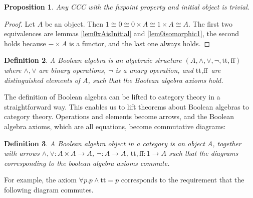 \documentclass[a4paper]{article}
\newcommand{\arr}{\rightarrow}
\newcommand{\product}{\!\times\!}
\newtheorem{definition}{Definition}[section]
\newtheorem{proposition}[definition]{Proposition}
\begin{document}
\begin{proposition} \label{propCCCNoFixpointInitialObject}
Any CCC with the fixpoint property and initial object is trivial.
\end{proposition}

\begin{proof}
Let $A$ be an object.  Then $1 \cong 0 \cong 0 \product A \cong 1 \product A
\cong A$. The first two equivalences are lemmas \ref{lem0xAisInitial} and
\ref{lem0isomorphic1}, the second holds because $- \product A$ is a functor, and
the last one always holds.
\end{proof}

\newcommand{\true}{\text{tt}}
\newcommand{\false}{\text{ff}}

\begin{definition}
A \emph{Boolean algebra} is an algebraic structure $(A, \wedge, \vee, \neg,
\true, \false)$ where $\wedge, \vee$ are binary operations, $\neg$ is a unary
operation, and $\true, \false$ are distinguished elements of $A$, such that the
Boolean algebra axioms hold.
\end{definition}

The definition of Boolean algebra can be lifted to category theory in a
straightforward way. This enables us to lift theorems about Boolean algebras to
category theory. Operations and elements become arrows, and the Boolean algebra
axioms, which are all equations, become commutative diagrams:

\begin{definition}
A \emph{Boolean algebra object} in a category is an object A,
together with arrows $\wedge, \vee : A \product A \arr A$, $\neg : A \arr A$,
$\true, \false : 1 \arr A$ such that the diagrams corresponding to the boolean
algebra axioms commute.
\end{definition}

For example, the axiom $\forall p . p \wedge \true = p$ corresponds to the
requirement that the following diagram commutes.

\begin{figure}[h]
\begin{center}
\end{center}
\end{figure}
\end{document}
